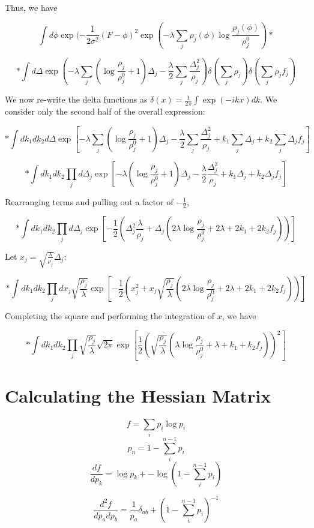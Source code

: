 \documentclass[12pt]{article}
\begin{document}
Thus, we have

$$\int d\phi \exp(-\frac{1}{2 \sigma^2} (F - \phi)^2 \exp(-\lambda \sum_j \rho_j(\phi) \log \frac{\rho_j(\phi)}{\rho_j^0}) * $$

$$ * \int d\Delta  \exp( -\lambda \sum_j (\log \frac{\rho_j}{\rho_j^0} + 1) \Delta_j -\frac{\lambda}{2} \sum_j \frac{\Delta_j^2}{\rho_j}) \delta(\sum_j \rho_j) \delta(\sum_j \rho_j f_j)$$

We now re-write the delta functions as $\delta(x) = \frac{1}{2\pi} \int \exp(-i k x) dk$.  We consider only the second half of the overall expression:

$$ * \int dk_1 dk_2 d\Delta  \exp[ -\lambda \sum_j (\log \frac{\rho_j}{\rho_j^0} + 1) \Delta_j -\frac{\lambda}{2} \sum_j \frac{\Delta_j^2}{\rho_j} + k_1 \sum_j \Delta_j  + k_2 \sum_j \Delta_j f_j]$$


$$ * \int dk_1 dk_2 \prod_j d\Delta_j  \exp[ -\lambda (\log \frac{\rho_j}{\rho_j^0} + 1) \Delta_j -\frac{\lambda}{2} \frac{\Delta_j^2}{\rho_j} + k_1 \Delta_j  + k_2 \Delta_j f_j]$$

Rearranging terms and pulling out a factor of $-\frac{1}{2}$, 

$$ * \int dk_1 dk_2 \prod_j d\Delta_j  \exp[ -\frac{1}{2}(\Delta_j^2 \frac{\lambda}{\rho_j} + \Delta_j (2 \lambda \log \frac{\rho_j}{\rho_j^0} + 2 \lambda  + 2 k_1 + 2 k_2 f_j))]$$

Let $x_j = \sqrt{\frac{\lambda}{\rho_j}} \Delta_j$:

$$ * \int dk_1 dk_2 \prod_j dx_j \sqrt{\frac{\rho_j}{\lambda}}  \exp[ -\frac{1}{2}(x_j^2  + x_j \sqrt{\frac{\rho_j}{\lambda}}(2 \lambda \log \frac{\rho_j}{\rho_j^0} + 2 \lambda  + 2 k_1 + 2 k_2 f_j))]$$

Completing the square and performing the integration of $x$, we have

$$ * \int dk_1 dk_2 \prod_j  \sqrt{\frac{\rho_j}{\lambda}} \sqrt{2 \pi}  \exp[ \frac{1}{2}(\sqrt{\frac{\rho_j}{\lambda}}( \lambda \log \frac{\rho_j}{\rho_j^0} +  \lambda  +  k_1 +  k_2 f_j))^2]$$


\section{Calculating the Hessian Matrix}

$$f = \sum_i p_i \log p_i$$
$$p_n = 1 - \sum_i^{n-1} p_i$$
$$\frac{df}{dp_k} =  \log p_k + -\log (1 - \sum_i^{n-1} p_i)$$

$$\frac{d^2f}{dp_a dp_b} = \frac{1}{p_a} \delta_{ab} + (1 - \sum_i^{n-1} p_i)^{-1}$$
\end{document}
